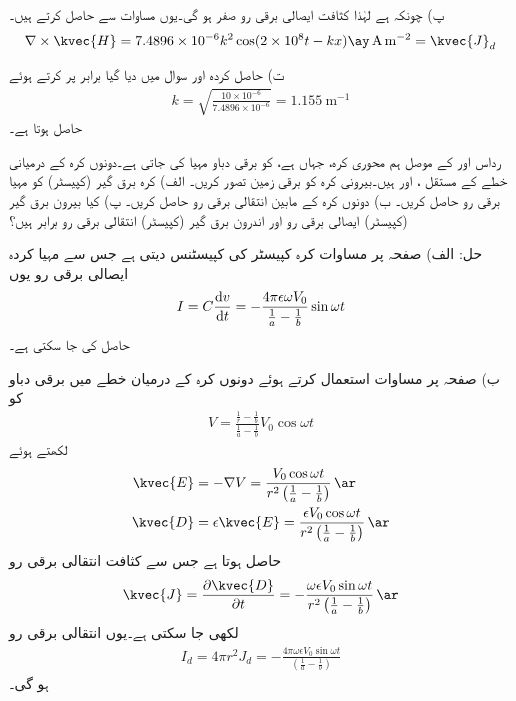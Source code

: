 پ) چونکہ  ہے لہٰذا کثافت ایصالی برقی رو صفر ہو گی۔یوں مساوات  سے  حاصل کرتے ہیں۔
\begin{align*}
\nabla \times \kvec{H}=7.4896 \times 10^{-6} k^2 \cos (2\times 10^8 t - k x) \ay \, \si{\ampere\per\meter\squared}=\kvec{J}_d
\end{align*}

ت) حاصل کردہ اور سوال میں دیا گیا  برابر پر کرتے ہوئے
\begin{align*}
k=\sqrt{\frac{10\times 10^{-6}}{7.4896\times 10^{-6}}}=\SI{1.155}{\meter^{-1}}
\end{align*}
حاصل ہوتا ہے۔

رداس  اور  کے موصل ہم محوری کرہ، جہاں  ہے، کو برقی دباو  مہیا کی جاتی ہے۔دونوں کرہ کے درمیانی خطے کے مستقل ،  اور  ہیں۔بیرونی کرہ کو برقی زمین تصور کریں۔ الف)  کرہ برق گیر (کپیسٹر)  کو مہیا برقی رو حاصل کریں۔ ب) دونوں کرہ کے مابین انتقالی برقی رو حاصل کریں۔ پ) کیا بیرون برق گیر (کپیسٹر)  ایصالی برقی رو اور اندرون برق گیر (کپیسٹر)  انتقالی برقی رو برابر ہیں؟

حل: الف) صفحہ  پر مساوات  کرہ کپیسٹر کی کپیسٹنس دیتی ہے جس سے مہیا کردہ ایصالی برقی رو یوں
\begin{align*}
I=C\frac{\dif v}{\dif t}=-\frac{4\pi\epsilon \omega V_0}{\frac{1}{a}-\frac{1}{b}} \sin \omega t
\end{align*}
حاصل کی جا سکتی ہے۔

ب) صفحہ  پر مساوات  استعمال کرتے ہوئے دونوں کرہ کے درمیان خطے میں برقی دباو کو
\begin{align*}
V=\frac{\frac{1}{r}-\frac{1}{b}}{\frac{1}{a}-\frac{1}{b}} V_0 \cos \omega t
\end{align*}
لکھتے ہوئے 
\begin{align*}
\kvec{E}&=-\nabla V=\frac{V_0 \cos \omega t}{r^2\left(\frac{1}{a}-\frac{1}{b}\right)}  \, \ar\\
\kvec{D}&=\epsilon \kvec{E}=\frac{\epsilon V_0 \cos \omega t}{r^2\left(\frac{1}{a}-\frac{1}{b}\right)} \, \ar
\end{align*}
حاصل ہوتا ہے جس سے کثافت انتقالی برقی رو  
\begin{align*}
\kvec{J}=\frac{\partial \kvec{D}}{\partial t}=-\frac{\omega \epsilon V_0 \sin \omega t}{r^2\left(\frac{1}{a}-\frac{1}{b}\right)} \, \ar
\end{align*}
لکھی جا سکتی ہے۔یوں انتقالی برقی رو
\begin{align*}
I_d=4\pi r^2 J_d=-\frac{4 \pi \omega \epsilon V_0 \sin \omega t}{\left(\frac{1}{a}-\frac{1}{b}\right)} 
\end{align*}
ہو گی۔

